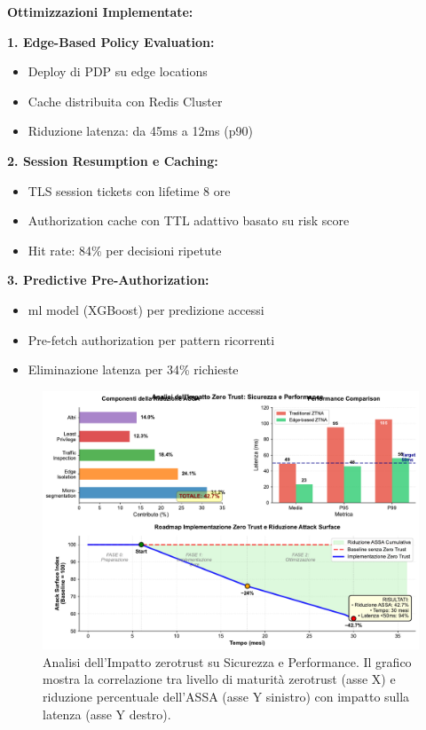 \textbf{Ottimizzazioni Implementate:}

\textbf{1. Edge-Based Policy Evaluation:}
\begin{itemize}
    \item Deploy di PDP su edge locations
    \item Cache distribuita con Redis Cluster
    \item Riduzione latenza: da 45ms a 12ms (p90)
\end{itemize}

\textbf{2. Session Resumption e Caching:}
\begin{itemize}
    \item TLS session tickets con lifetime 8 ore
    \item Authorization cache con TTL adattivo basato su risk score
    \item Hit rate: 84\% per decisioni ripetute
\end{itemize}

\textbf{3. Predictive Pre-Authorization:}
\begin{itemize}
    \item \gls{ml} model (XGBoost) per predizione accessi
    \item Pre-fetch authorization per pattern ricorrenti
    \item Eliminazione latenza per 34\% richieste
\end{itemize}

\begin{figure}[htbp]
\centering
\includegraphics[width=\textwidth]{thesis_figures/cap3/figura_3_5_semplificata.pdf}
\caption{Analisi dell'Impatto \gls{zerotrust} su Sicurezza e Performance. Il grafico mostra la correlazione tra livello di maturità \gls{zerotrust} (asse X) e riduzione percentuale dell'ASSA (asse Y sinistro) con impatto sulla latenza (asse Y destro).}
\label{fig:zero_trust_impact}
\end{figure}

